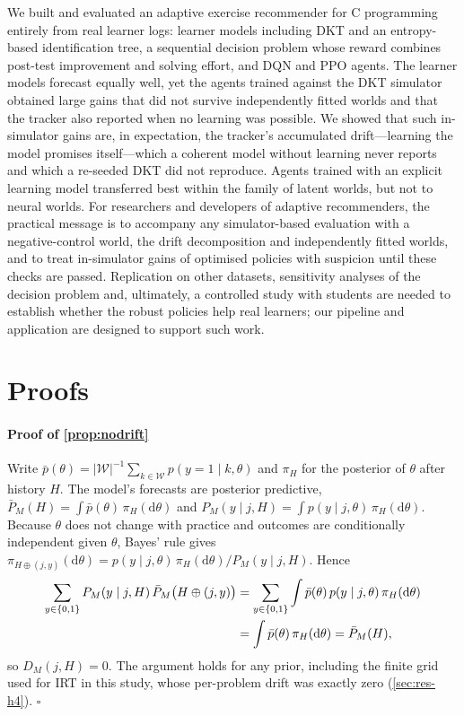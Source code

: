 \documentclass[a4paper,preprint,12pt,authoryear]{elsarticle}
\begin{document}
We built and evaluated an adaptive exercise recommender for C programming entirely from real learner logs: learner models including DKT and an entropy-based identification tree, a sequential decision problem whose reward combines post-test improvement and solving effort, and DQN and PPO agents. The learner models forecast equally well, yet the agents trained against the DKT simulator obtained large gains that did not survive independently fitted worlds and that the tracker also reported when no learning was possible. We showed that such in-simulator gains are, in expectation, the tracker's accumulated drift---learning the model promises itself---which a coherent model without learning never reports and which a re-seeded DKT did not reproduce. Agents trained with an explicit learning model transferred best within the family of latent worlds, but not to neural worlds. For researchers and developers of adaptive recommenders, the practical message is to accompany any simulator-based evaluation with a negative-control world, the drift decomposition and independently fitted worlds, and to treat in-simulator gains of optimised policies with suspicion until these checks are passed. Replication on other datasets, sensitivity analyses of the decision problem and, ultimately, a controlled study with students are needed to establish whether the robust policies help real learners; our pipeline and application are designed to support such work.

\appendix
\section{Proofs}\label{app:proofs}

\paragraph{Proof of \cref{prop:nodrift}} Write $\bar p(\theta)=|\mathcal W|^{-1}\sum_{k\in\mathcal W}p(y=1\mid k,\theta)$ and $\pi_H$ for the posterior of $\theta$ after history $H$. The model's forecasts are posterior predictive, $\bar P_M(H)=\int\bar p(\theta)\,\pi_H(\mathrm d\theta)$ and $P_M(y\mid j,H)=\int p(y\mid j,\theta)\,\pi_H(\mathrm d\theta)$. Because $\theta$ does not change with practice and outcomes are conditionally independent given $\theta$, Bayes' rule gives $\pi_{H\oplus(j,y)}(\mathrm d\theta)=p(y\mid j,\theta)\,\pi_H(\mathrm d\theta)/P_M(y\mid j,H)$. Hence
\begin{align}
\sum_{y\in\{0,1\}}P_M(y\mid j,H)\,\bar P_M\bigl(H\oplus(j,y)\bigr)
&=\sum_{y\in\{0,1\}}\int\bar p(\theta)\,p(y\mid j,\theta)\,\pi_H(\mathrm d\theta)\notag\\
&=\int\bar p(\theta)\,\pi_H(\mathrm d\theta)=\bar P_M(H),
\end{align}
so $D_M(j,H)=0$. The argument holds for any prior, including the finite grid used for IRT in this study, whose per-problem drift was exactly zero (\cref{sec:res-h4}). $\square$
\end{document}

